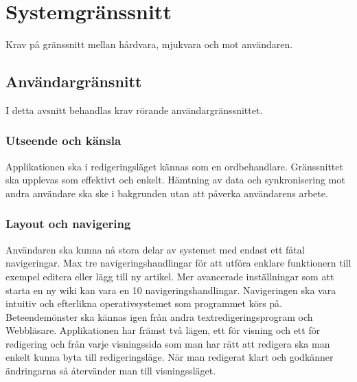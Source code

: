 \section{Systemgränssnitt}
Krav på gränssnitt mellan hårdvara, mjukvara och mot användaren. 
\subsection{Användargränsnitt}
I detta avsnitt behandlas krav rörande användargränssnittet. 

\subsubsection{Utseende och känsla}
Applikationen ska i redigeringsläget kännas som en ordbehandlare. Gränssnittet ska upplevas som effektivt och enkelt. Hämtning av data och synkronisering mot andra användare ska ske i bakgrunden utan att påverka användarens arbete. 

\subsubsection{Layout och navigering}
Användaren ska kunna nå stora delar av systemet med endast ett fåtal navigeringar. Max tre navigeringshandlingar för att utföra enklare funktionern till exempel editera eller lägg till ny artikel. Mer avancerade inställningar som att starta en ny wiki kan vara en 10 navigeringshandlingar. Navigeringen ska vara intuitiv och efterlikna operativsystemet som programmet körs på. Beteendemönster ska kännas igen från andra textredigeringsprogram och Webbläsare. Applikationen har främst två lägen, ett för visning och ett för redigering och från varje visningssida som man har rätt att redigera ska man enkelt kunna byta till redigeringsläge. När man redigerat klart och godkänner ändringarna så återvänder man till visningssläget.


